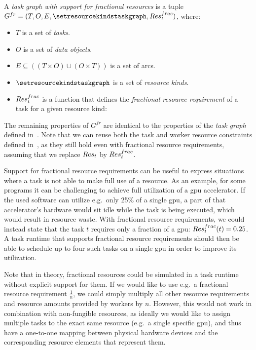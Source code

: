 \vspace{2mm} A
\emph{task graph with support for fractional resources} is a tuple \\
$G^{fr} = (T, O, E, \setresourcekindstaskgraph, \fntaskresfrac)$, where:
\begin{itemize}[itemsep=0pt]
	\item $T$ is a set of \emph{tasks}.
	\item $O$ is a set of \emph{data objects}.
	\item $E \subseteq ((T\times{}O) \cup (O\times{}T))$ is a set of arcs.
	\item $\setresourcekindstaskgraph$ is a set of \emph{resource kinds}.
	\item $Res_t^{frac}$ is a function that defines the
	\emph{fractional resource requirement} of a task for a given resource kind: \\
\end{itemize}

The remaining properties of $G^{fr}$ are identical to the properties of the \emph{task graph}
defined in~. Note that we can reuse both the task and worker resource
constraints defined in~, as they still hold even with
fractional resource requirements, assuming that we replace $Res_t$ by $Res_t^{frac}$.

Support for fractional resource requirements can be useful to express situations where a task is
not able to make full use of a resource. As an example, for some programs it can be challenging to
achieve full utilization of a \gls{gpu} accelerator. If the used software can utilize
e.g.\ only 25\% of a single \gls{gpu}, a part of that accelerator's hardware would
sit idle while the task is being executed, which would result in resource waste. With fractional
resource requirements, we could instead state that the task $t$ requires only a
fraction of a \gls{gpu}: $Res_t^{frac}(t) = 0.25$. A task runtime that supports
fractional resource requirements should then be able to schedule up to four such tasks on a single
\gls{gpu} in order to improve its utilization.

Note that in theory, fractional resources could be simulated in a task runtime without explicit
support for them. If we would like to use e.g.\ a fractional resource requirement
$\frac{1}{n}$, we could simply multiply all other resource requirements and resource
amounts provided by workers by $n$. However, this would not work in combination
with non-fungible resources, as ideally we would like to assign multiple tasks to the exact same
resource (e.g.\ a single specific \gls{gpu}), and thus have a one-to-one mapping
between physical hardware devices and the corresponding resource elements that represent them.

